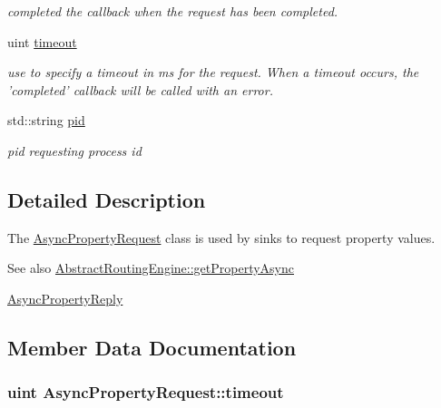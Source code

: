 \begin{DoxyCompactItemize}
\begin{DoxyCompactList}\small\item\em completed the callback when the request has been completed. \end{DoxyCompactList}\item 
uint \hyperlink{classAsyncPropertyRequest_a449da60204ce7c13462be179f869105c}{timeout}
\begin{DoxyCompactList}\small\item\em use to specify a timeout in ms for the request. When a timeout occurs, the 'completed' callback will be called with an error. \end{DoxyCompactList}\item 
\hypertarget{classAsyncPropertyRequest_abaa035426c3ac48fe53de273b1a60eba}{std\+::string \hyperlink{classAsyncPropertyRequest_abaa035426c3ac48fe53de273b1a60eba}{pid}}\label{classAsyncPropertyRequest_abaa035426c3ac48fe53de273b1a60eba}

\begin{DoxyCompactList}\small\item\em pid requesting process id \end{DoxyCompactList}\end{DoxyCompactItemize}


\subsection{Detailed Description}
The \hyperlink{classAsyncPropertyRequest}{Async\+Property\+Request} class is used by sinks to request property values. 

\begin{DoxySeeAlso}{See also}
\hyperlink{classAbstractRoutingEngine_ad1cbda415f674be4a3ce49be05aa8ee8}{Abstract\+Routing\+Engine\+::get\+Property\+Async} 

\hyperlink{classAsyncPropertyReply}{Async\+Property\+Reply} 
\end{DoxySeeAlso}


\subsection{Member Data Documentation}
\hypertarget{classAsyncPropertyRequest_a449da60204ce7c13462be179f869105c}{
\subsubsection[{timeout}]{\setlength{\rightskip}{0pt plus 5cm}uint Async\+Property\+Request\+::timeout}}\label{classAsyncPropertyRequest_a449da60204ce7c13462be179f869105c}


